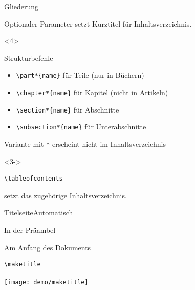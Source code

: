 \begin{Frame}[fragile,t]{Gliederung}
\begin{onlyenv}
    Optionaler Parameter setzt Kurztitel für Inhaltsverzeichnis.
  \end{onlyenv}

  \begin{onlyenv}<4>
    \begin{Block}{Strukturbefehle}
      \begin{itemize}
        \item \lstinline-\part*{name}- für Teile (nur in Büchern)
        \item \lstinline-\chapter*{name}- für Kapitel (nicht in Artikeln)
        \item \lstinline-\section*{name}- für Abschnitte
        \item \lstinline-\subsection*{name}- für Unterabschnitte
      \end{itemize}
    \end{Block}

    Variante mit \texttt{*} erscheint nicht im Inhaltsverzeichnis
  \end{onlyenv}

  \xxx

  \begin{onlyenv}<3->
    \begin{lstlisting}[gobble=6]
      \tableofcontents
    \end{lstlisting}
    setzt das zugehörige Inhaltsverzeichnis.
  \end{onlyenv}
\end{Frame}

\begin{Frame}[t,fragile]{Titelseite}{Automatisch}
  \begin{Block}{In der Präambel}
    
  \end{Block}

  \begin{Block}{Am Anfang des Dokuments}
    \begin{lstlisting}[gobble=6,style=block]
      \maketitle
    \end{lstlisting}
  \end{Block}

  \hfill \texttt{[image: demo/maketitle]} \hfill
\end{Frame}

